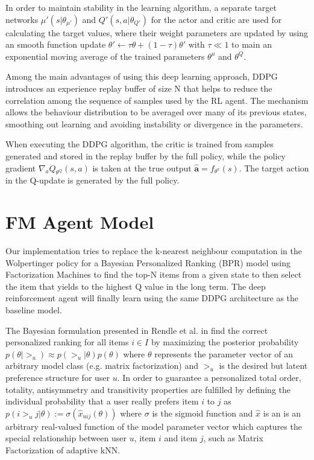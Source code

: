 In order to maintain stability in the learning algorithm, a separate target networks $\mu'(s|\theta_{\mu'})$ and $Q'(s, a|\theta_{Q'})$ for the actor and critic are used for calculating the target values, where their weight parameters are updated by using an smooth function update $\theta' \leftarrow \tau\theta + (1 - \tau)\theta'$ with $\tau \ll 1$ to main an exponential moving average of the trained parameters $\theta^{\mu}$ and $\theta^{Q}$.
 
Among the main advantages of using this deep learning approach, DDPG introduces an experience replay buffer of size N that helps to reduce the correlation among the sequence of samples used by the RL agent. The mechanism allows the behaviour distribution to be averaged over many of its previous states, smoothing out learning and avoiding instability or divergence in the parameters.

When executing the DDPG algorithm, the critic is trained from samples generated and stored in the replay buffer by the full policy, while the policy gradient $\nabla_a Q_{\theta^Q}(s,a)$ is taken at the true output $\hat{\mathbf{a}} = f_{\theta^{\pi}}(s)$. The target action in the Q-update is generated by the full policy.

\section{FM Agent Model}

Our implementation tries to replace the k-nearest neighbour computation in the Wolpertinger policy for a Bayesian Personalized Ranking (BPR) model using Factorization Machines to find the top-N items from a given state to then select the item that yields to the highest Q value in the long term. The deep reinforcement agent will finally learn using the same DDPG architecture as the baseline model.

The Bayesian formulation presented in Rendle et al. in \cite{rendle2009bpr} find the correct personalized  ranking  for  all  items $i \in I$ by maximizing the posterior probability $p(\theta | >_u) \approx p(>_u | \theta) p(\theta)$ where $\theta$ represents the parameter vector of an arbitrary model class (e.g. matrix factorization) and $>_u$ is the desired but latent preference structure for user $u$. In order to guarantee a personalized total order, totality, antisymmetry and transitivity properties are fulfilled by defining the individual probability that a user really prefers item $i$ to $j$ as $p(i >_u j | \theta ) := \sigma(\hat{x}_{uij}(\theta))$ where $\sigma$ is the sigmoid function and $\hat{x}$ is an is  an  arbitrary  real-valued  function of the model parameter vector which captures the special relationship between user $u$, item $i$ and item $j$, such as Matrix Factorization of adaptive kNN.

